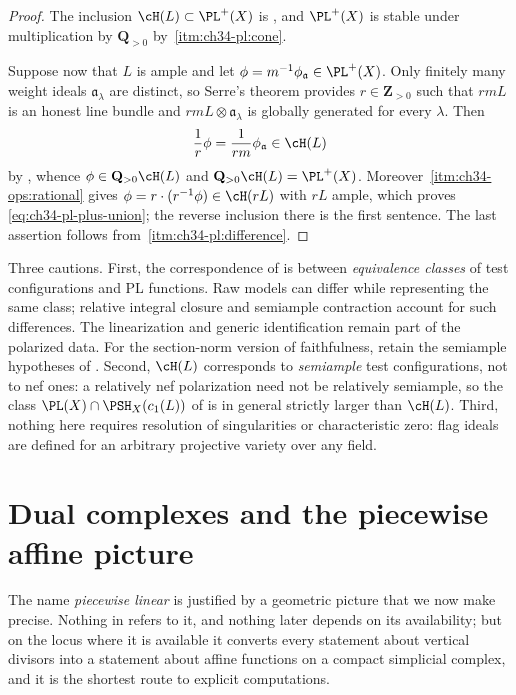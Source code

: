 \begin{proof}
The inclusion $\cH(L)\subset\PL^+(X)$ is
, and $\PL^+(X)$ is stable under
multiplication by $\mathbf Q_{>0}$ by
\,\cref{itm:ch34-pl:cone}.

Suppose now that $L$ is ample and let
$\phi=m^{-1}\phi_{\mathfrak a}\in\PL^+(X)$.  Only finitely many weight
ideals $\mathfrak a_\lambda$ are distinct, so Serre's theorem provides
$r\in\mathbf Z_{>0}$ such that $rmL$ is an honest line bundle and
$rmL\otimes\mathfrak a_\lambda$ is globally generated for every
$\lambda$.  Then
\[
 \frac1r\phi=\frac1{rm}\phi_{\mathfrak a}\in\cH(L)
\]
by , whence
$\phi\in\mathbf Q_{>0}\cH(L)$ and
$\mathbf Q_{>0}\cH(L)=\PL^+(X)$.  Moreover
\,\cref{itm:ch34-ops:rational} gives
$\phi=r\cdot(r^{-1}\phi)\in\cH(rL)$ with $rL$ ample, which proves
\eqref{eq:ch34-pl-plus-union}; the reverse inclusion there is the first
sentence.  The last assertion follows from
\,\cref{itm:ch34-pl:difference}.
\end{proof}

\begin{remark}
\label{rem:ch34-tc-scope}
Three cautions.  First, the correspondence of
 is between \emph{equivalence classes} of
test configurations and PL functions.  Raw models can differ while
representing the same class; relative integral closure and semiample
contraction account for such differences.  The linearization and generic
identification remain part of the polarized data.  For the section-norm
version of faithfulness, retain the semiample hypotheses of
.  Second, $\cH(L)$ corresponds to
\emph{semiample} test configurations, not to nef ones: a relatively nef
polarization need not be relatively semiample, so the class
$\PL(X)\cap\PSH_X(c_1(L))$ of  is in general
strictly larger than $\cH(L)$.  Third, nothing here requires resolution of
singularities or characteristic zero: flag ideals are defined for an
arbitrary projective variety over any field.
\end{remark}
\section{Dual complexes and the piecewise affine picture}
\label{sec:ch34-dual-complexes}

The name \emph{piecewise linear} is justified by a geometric picture that we
now make precise.  Nothing in  refers to it, and
nothing later depends on its availability; but on the locus where it is
available it converts every statement about vertical divisors into a
statement about affine functions on a compact simplicial complex, and it is
the shortest route to explicit computations.

